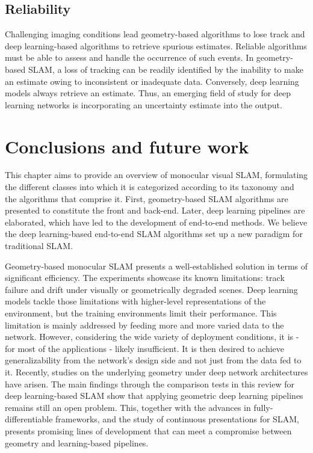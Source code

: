 \subsection{Reliability}
Challenging imaging conditions lead geometry-based algorithms to lose track and deep learning-based algorithms to retrieve spurious estimates. Reliable algorithms must be able to assess and handle the occurrence of such events.
In geometry-based SLAM, a loss of tracking can be readily identified by the inability to make an estimate owing to inconsistent or inadequate data. Conversely, deep learning models always retrieve an estimate.
Thus, an emerging field of study for deep learning networks is incorporating an uncertainty estimate into the output.
\section{Conclusions and future work}
\label{sec:futurework}
This chapter aims to provide an overview of monocular visual SLAM, formulating the different classes into which it is categorized according to its taxonomy and the algorithms that comprise it. First, geometry-based SLAM algorithms are presented to constitute the front and back-end. Later, deep learning pipelines are elaborated, which have led to the development of end-to-end methods. We believe the deep learning-based end-to-end SLAM algorithms set up a new paradigm for traditional SLAM.

Geometry-based monocular SLAM presents a well-established solution in terms of significant efficiency. The experiments showcase its known limitations: track failure and drift under visually or geometrically degraded scenes. Deep learning models tackle those limitations with higher-level representations of the environment, but the training environments limit their performance.
This limitation is mainly addressed by feeding more and more varied data to the network. However, considering the wide variety of deployment conditions, it is - for most of the applications - likely insufficient. It is then desired to achieve generalizability from the network's design side and not just from the data fed to it. Recently, studies on the underlying geometry under deep network architectures have arisen. The main findings through the comparison tests in this review for deep learning-based SLAM show that applying  geometric deep learning
pipelines remains still an open problem. This, together with the advances in fully-differentiable frameworks, and the study of continuous presentations for SLAM, presents promising lines of development that can meet a compromise between geometry and learning-based pipelines.